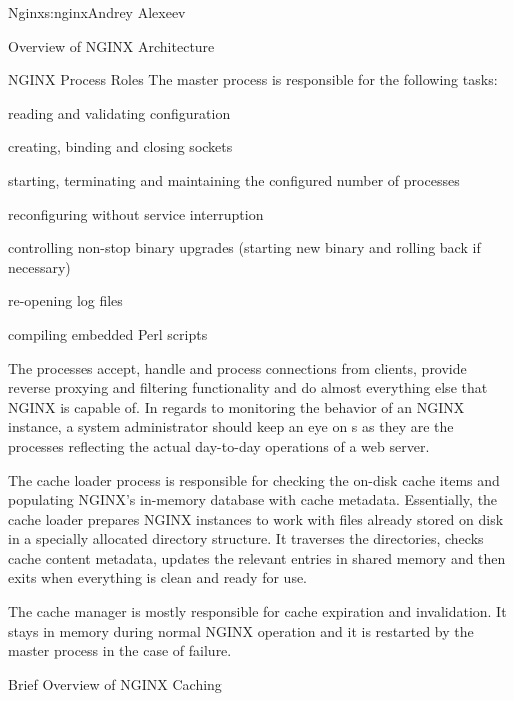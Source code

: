 \begin{aosachapter}{Nginx}{s:nginx}{Andrey Alexeev}
\begin{aosasect1}{Overview of NGINX Architecture}
\begin{aosasect2}{NGINX Process Roles}
The master process is responsible for the following tasks:

\begin{aosaitemize}

\item reading and validating configuration

\item creating, binding and closing sockets

\item starting, terminating and maintaining the configured number of
   processes

\item reconfiguring without service interruption

\item controlling non-stop binary upgrades (starting new binary and
rolling back if necessary)

\item re-opening log files

\item compiling embedded Perl scripts

\end{aosaitemize}

The  processes accept, handle and process connections
from clients, provide reverse proxying and filtering functionality and
do almost everything else that NGINX is capable of. In regards to
monitoring the behavior of an NGINX instance, a system administrator
should keep an eye on s as they are the processes
reflecting the actual day-to-day operations of a web server.

The cache loader process is responsible for checking the on-disk cache
items and populating NGINX's in-memory database with cache
metadata. Essentially, the cache loader prepares NGINX instances to
work with files already stored on disk in a specially allocated
directory structure. It traverses the directories, checks cache
content metadata, updates the relevant entries in shared memory and
then exits when everything is clean and ready for use.

The cache manager is mostly responsible for cache expiration and
invalidation. It stays in memory during normal NGINX operation and it
is restarted by the master process in the case of failure.

\end{aosasect2}

\begin{aosasect2}{Brief Overview of NGINX Caching}


\end{aosasect2}
\end{aosasect1}
\end{aosachapter}

